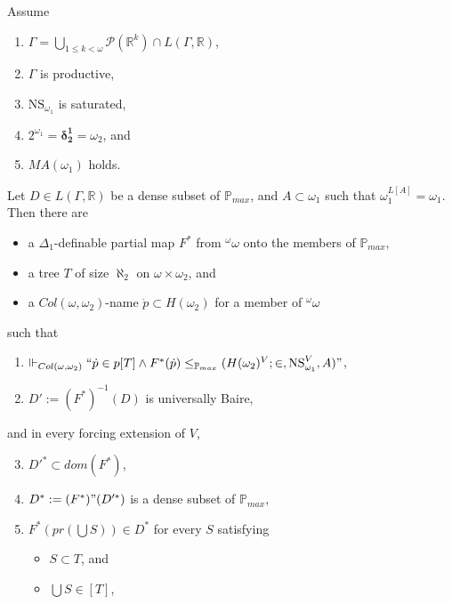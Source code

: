\documentclass[12pt]{article}
\numberwithin{equation}{section}
\begin{document}
\begin{fact}\label{fact434}
Assume
\begin{enumerate}[label=(\roman*), leftmargin=40pt]
    \item $\Gamma  = \bigcup_{1 \leq k < \omega} \mathcal{P}(\mathbb{R}^{k}) \cap L(\Gamma, \mathbb{R})$,
    \item $\Gamma$ is productive,
    \item $\mathrm{NS}_{\omega_1}$ is saturated,
    \item $2^{\omega_1} = \mathbf{\delta^1_2} = \omega_2$, and
    \item $MA(\omega_1)$ holds.
\end{enumerate}
Let $D \in L(\Gamma, \mathbb{R})$ be a dense subset of $\mathbb{P}_{max}$, and $A \subset \omega_1$ such that $\omega_1^{L[A]} = \omega_1$. Then there are
\begin{itemize}
    \item a $\Delta_1$-definable partial map $F^*$ from $^{\omega}{\omega}$ onto the members of $\mathbb{P}_{max}$,
    \item a tree $T$ of size $\aleph_2$ on $\omega \times \omega_2$, and
    \item a $Col(\omega, \omega_2)$-name $\dot{p} \subset H(\omega_2)$ for a member of ${^{\omega}{\omega}}$
\end{itemize}
such that 
\begin{enumerate}[label=(4.34.\arabic*), leftmargin=50pt]
    \item\label{4341} $\Vdash_{Col(\omega, \omega_2)} ``\dot{p} \in p[T] \wedge F^*(\dot{p}) \leq_{\mathbb{P}_{max}} (H(\omega_2)^V; \in, \mathrm{NS}_{\omega_1}^V, A)"$,
    \item\label{4342} $D' := (F^*)^{-1}(D)$ is universally Baire, 
\end{enumerate}
and in every forcing extension of $V$,
\begin{enumerate}[label=(4.34.\arabic*), leftmargin=50pt]
    \setcounter{enumi}{2}
    \item\label{4343} $D'^* \subset dom(F^*)$,
    \item\label{4344} $D^* := (F^*) " (D'^*)$ is a dense subset of $\mathbb{P}_{max}$, 
    \item\label{4345} $F^*(pr(\bigcup S)) \in D^*$ for every $S$ satisfying
    \begin{itemize}
        \item $S \subset T$, and
        \item $\bigcup S \in [T]$, 
    \end{itemize}

\end{enumerate}
\end{fact}
\end{document}
